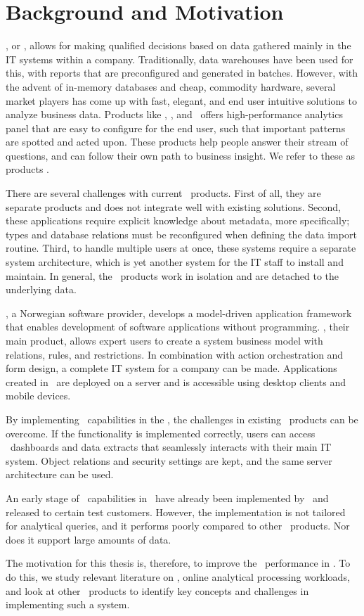 \section{Background and Motivation}
\label{sec:background-and-motivation}

\bi, or \ba, allows for making qualified decisions based on data gathered mainly in the IT systems within a company. Traditionally, data warehouses have been used for this, with reports that are preconfigured and generated in batches. However, with the advent of in-memory databases and cheap, commodity hardware, several market players has come up with fast, elegant, and end user intuitive solutions to analyze business data. Products like \qlikview, \tableau, and \powerpivot~offers high-performance analytics panel that are easy to configure for the end user, such that important patterns are spotted and acted upon. These products help people answer their stream of questions, and can follow their own path to business insight. We refer to these as  products \cite{Qlik2014-vd}.

There are several challenges with current \bd~products. First of all, they are separate products and does not integrate well with existing solutions. Second, these applications require explicit knowledge about metadata, more specifically; types and database relations must be reconfigured when defining the data import routine.  Third, to handle multiple users at once, these systems require a separate system architecture, which is yet another system for the IT staff to install and maintain. In general, the \bd~products work in isolation and are detached to the underlying data.

\genus, a Norwegian software provider, develops a model-driven application framework that enables development of software applications without programming. \genusSoftware, their main product, allows expert users to create a system business model with relations, rules, and restrictions. In combination with action orchestration and form design, a complete IT system for a company can be made. Applications created in \genusSoftware~are deployed on a server and is accessible using desktop clients and mobile devices.

By implementing \bd~capabilities in the \genusSoftware, the challenges in existing \bd~products can be overcome. If the functionality is implemented correctly, users can access \bd~dashboards and data extracts that seamlessly interacts with their main IT system. Object relations and security settings are kept, and the same server architecture can be used. 

An early stage of \bd~capabilities in \genusSoftware~have already been implemented by \genus~and released to certain test customers. However, the implementation is not tailored for analytical queries, and it performs poorly compared to other \bd~products. Nor does it support large amounts of data. 

The motivation for this thesis is, therefore, to improve the \bd~performance in \genusSoftware. To do this, we study relevant literature on \bi, online analytical processing workloads, and look at other \bd~products to identify key concepts and challenges in implementing such a system. 
